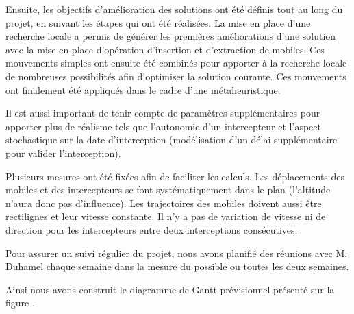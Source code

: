 		Ensuite, les objectifs d'amélioration des solutions ont été définis tout au long du projet, en suivant les étapes qui ont été réalisées. La mise en place d'une recherche locale a permis de générer les premières améliorations d'une solution avec la mise en place d'opération d'insertion et d'extraction de mobiles. Ces mouvements simples ont ensuite été combinés pour apporter à la recherche locale de nombreuses possibilités afin d'optimiser la solution courante. Ces mouvements ont finalement été appliqués dans le cadre d'une métaheuristique.
		
		Il est aussi important de tenir compte de paramètres supplémentaires pour apporter plus de réalisme tels que l'autonomie d'un intercepteur et l'aspect stochastique sur la date d'interception (modélisation d'un délai supplémentaire pour valider l'interception).
		
		
		Plusieurs mesures ont été fixées afin de faciliter les calculs. Les déplacements des mobiles et des intercepteurs se font systématiquement dans le plan (l'altitude n'aura donc pas d'influence). Les trajectoires des mobiles doivent aussi être rectilignes et leur vitesse constante. Il n'y a pas de variation de vitesse ni de direction pour les intercepteurs entre deux interceptions consécutives.




		Pour assurer un suivi régulier du projet, nous avons planifié des réunions avec M. Duhamel chaque semaine dans la mesure du possible ou toutes les deux semaines.

		Ainsi nous avons construit le diagramme de Gantt prévisionnel présenté sur la figure .

